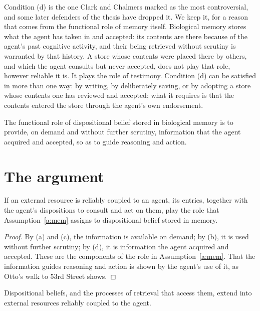 \documentclass{situationist-preprint}
\begin{document}
Condition (d) is the one Clark and Chalmers marked as the most controversial, and some later defenders of the thesis have dropped it. We keep it, for a reason that comes from the functional role of memory itself. Biological memory stores what the agent has taken in and accepted: its contents are there because of the agent's past cognitive activity, and their being retrieved without scrutiny is warranted by that history. A store whose contents were placed there by others, and which the agent consults but never accepted, does not play that role, however reliable it is. It plays the role of testimony. Condition (d) can be satisfied in more than one way: by writing, by deliberately saving, or by adopting a store whose contents one has reviewed and accepted; what it requires is that the contents entered the store through the agent's own endorsement.

\begin{assumption}\label{a:mem}
The functional role of dispositional belief stored in biological memory is to provide, on demand and without further scrutiny, information that the agent acquired and accepted, so as to guide reasoning and action.
\end{assumption}

\section{The argument}

\begin{lemma}\label{l:role}
If an external resource is reliably coupled to an agent, its entries, together with the agent's dispositions to consult and act on them, play the role that Assumption~\ref{a:mem} assigns to dispositional belief stored in memory.
\end{lemma}

\begin{proof}
By (a) and (c), the information is available on demand; by (b), it is used without further scrutiny; by (d), it is information the agent acquired and accepted. These are the components of the role in Assumption~\ref{a:mem}. That the information guides reasoning and action is shown by the agent's use of it, as Otto's walk to 53rd Street shows.
\end{proof}

\begin{theorem}\label{t:main}
Dispositional beliefs, and the processes of retrieval that access them, extend into external resources reliably coupled to the agent.
\end{theorem}
\end{document}
